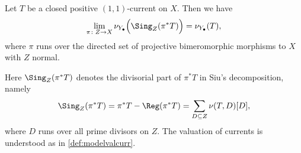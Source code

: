 \begin{lemma}\label{lma:valuationT} Let $T$ be a closed positive $(1,1)$-current on $X$. Then we have
    \begin{equation}\label{eq:nuTaslimit}
    \lim_{\pi\colon Z\rightarrow X} \nu_{Y_{\bullet}}\Bigl(\Sing_Z(\pi^*T)\Bigr)=\nu_{Y_{\bullet}}(T),
    \end{equation}
    where $\pi$ runs over the directed set of projective bimeromorphic morphisms to $X$ with $Z$ normal.
\end{lemma}
Here $\Sing_Z(\pi^*T)$ denotes the divisorial part of $\pi^*T$ in Siu's decomposition, namely
\[
\Sing_Z(\pi^*T)=\pi^*T-\Reg(\pi^*T)=\sum_{D\subseteq Z} \nu(T,D)[D],
\]
where $D$ runs over all prime divisors on $Z$.
The valuation of currents is understood as in \cref{def:modelvalcurr}.

